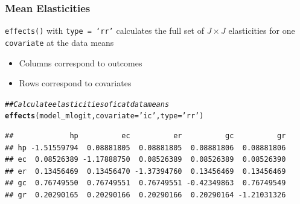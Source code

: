 \documentclass{beamer}\usepackage[]{graphicx}\usepackage[]{color}
\makeatletter
\newcommand{\hlstr}[1]{\textcolor[rgb]{0.192,0.494,0.8}{#1}}%
\newcommand{\hlcom}[1]{\textcolor[rgb]{0.678,0.584,0.686}{\textit{#1}}}%
\newcommand{\hlstd}[1]{\textcolor[rgb]{0.345,0.345,0.345}{#1}}%
\newcommand{\hlkwc}[1]{\textcolor[rgb]{0.333,0.667,0.333}{#1}}%
\newcommand{\hlkwd}[1]{\textcolor[rgb]{0.737,0.353,0.396}{\textbf{#1}}}%
\newenvironment{kframe}{%
 \def\at@end@of@kframe{}%
 \ifinner\ifhmode%
  \def\at@end@of@kframe{\end{minipage}}%
  \begin{minipage}{\columnwidth}%
 \fi\fi%
 \def\FrameCommand##1{\hskip\@totalleftmargin \hskip-\fboxsep
 \colorbox{shadecolor}{##1}\hskip-\fboxsep
     \hskip-\linewidth \hskip-\@totalleftmargin \hskip\columnwidth}%
 \MakeFramed {\advance\hsize-\width
   \@totalleftmargin\z@ \linewidth\hsize
   \@setminipage}}%
 {\par\unskip\endMakeFramed%
 \at@end@of@kframe}
\newenvironment{knitrout}{}{} %
\makeatother
\begin{document}
\begin{frame}[fragile]\frametitle{Mean Elasticities}
	  \texttt{effects()} with \texttt{type = `rr'} calculates the full set of $J \times J$ elasticities for one \texttt{covariate} at the data means
	  \begin{itemize}
        \item Columns correspond to outcomes
        \item Rows correspond to covariates
    \end{itemize}
\begin{knitrout}\footnotesize
{}\color{fgcolor}\begin{kframe}
\begin{alltt}
\hlcom{## Calculate elasticities of ic at data means}
\hlkwd{effects}\hlstd{(model_mlogit,} \hlkwc{covariate} \hlstd{=} \hlstr{'ic'}\hlstd{,} \hlkwc{type} \hlstd{=} \hlstr{'rr'}\hlstd{)}
\end{alltt}
\begin{verbatim}
##             hp          ec          er          gc          gr
## hp -1.51559794  0.08881805  0.08881805  0.08881806  0.08881806
## ec  0.08526389 -1.17888750  0.08526389  0.08526389  0.08526390
## er  0.13456469  0.13456470 -1.37394760  0.13456469  0.13456469
## gc  0.76749550  0.76749551  0.76749551 -0.42349863  0.76749549
## gr  0.20290165  0.20290166  0.20290166  0.20290164 -1.21031326
\end{verbatim}
\end{kframe}
\end{knitrout}
\end{frame}
\end{document}

